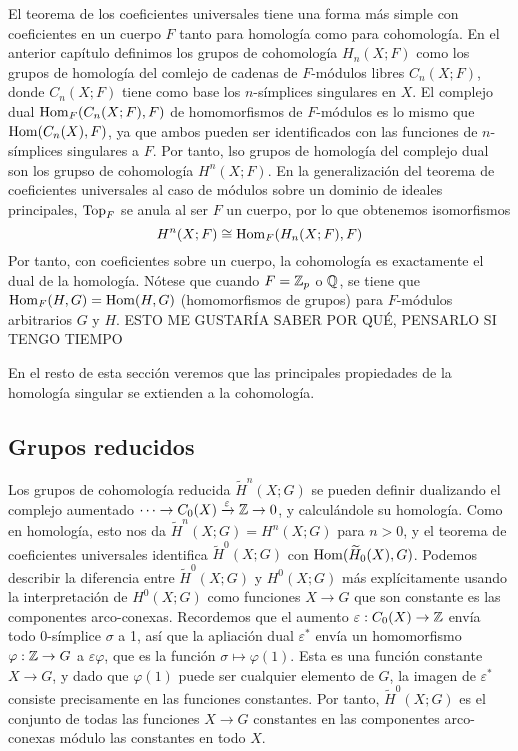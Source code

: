 \documentclass[TA.tex]{subfiles}
\begin{document}
El teorema de los coeficientes universales tiene una forma más simple con coeficientes en un cuerpo $F$ tanto para homología como para cohomología. En el anterior capítulo definimos los grupos de cohomología $H_n(X;F)$ como los grupos de homología del comlejo de cadenas de $F$-módulos libres $C_n(X;F)$, donde $C_n(X;F)$ tiene como base los $n$-símplices singulares en $X$. El complejo dual $\operatorname{Hom}_F(C_n(X;F),F)$ de homomorfismos de $F$-módulos es lo mismo que $\operatorname{Hom}(C_n(X),F)$, ya que ambos pueden ser identificados con las funciones de $n$-símplices singulares a $F$. Por tanto, lso grupos de homología del complejo dual son los grupso de cohomología $H^n(X;F)$. En la generalización del teorema de coeficientes universales al caso de módulos sobre un dominio de ideales principales, $\operatorname{Top}_F$ se anula al ser $F$ un cuerpo, por lo que obtenemos isomorfismos
\[
H^n(X;F)\cong \operatorname{Hom}_F(H_n(X;F),F)
\]
Por tanto, con coeficientes sobre un cuerpo, la cohomología es exactamente el dual de la homología. Nótese que cuando $F=\mathbb{Z}_p$ o $\mathbb{Q}$, se tiene que $\operatorname{Hom}_F(H,G)=\operatorname{Hom}(H,G)$ (homomorfismos de grupos) para $F$-módulos arbitrarios $G$ y $H$. ESTO ME GUSTARÍA SABER POR QUÉ, PENSARLO SI TENGO TIEMPO 

En el resto de esta sección veremos que las principales propiedades de la homología singular se extienden a la cohomología. 

\subsection{Grupos reducidos}
Los grupos de cohomología reducida $\widetilde{H}^n(X;G)$ se pueden definir dualizando el complejo aumentado $\cdots\to C_0(X)\xrightarrow{\varepsilon}\mathbb{Z}\to 0$, y calculándole su homología. Como en homología, esto nos da $\widetilde{H}^n(X;G)=H^n(X;G)$ para $n>0$, y el teorema de coeficientes universales identifica $\widetilde{H}^0(X;G)$ con $\operatorname{Hom}(\widetilde{H}_0(X),G)$. Podemos describir la diferencia entre $\widetilde{H}^0(X;G)$ y $H^0(X;G)$ más explícitamente usando la interpretación de $H^0(X;G)$ como funciones $X\to G$ que son constante es las componentes arco-conexas. Recordemos que el aumento $\varepsilon:C_0(X)\to\mathbb{Z}$ envía todo 0-símplice $\sigma$ a 1, así que la apliación dual $\varepsilon^*$ envía un homomorfismo $\varphi:\mathbb{Z}\to G$ a $\varepsilon\varphi$, que es la función $\sigma\mapsto\varphi(1)$. Esta es una función constante $X\to G$, y dado que $\varphi(1)$ puede ser cualquier elemento de $G$, la imagen de $\varepsilon^*$ consiste precisamente en las funciones constantes. Por tanto, $\widetilde{H}^0(X;G)$ es el conjunto de todas las funciones $X\to G$ constantes en las componentes arco-conexas módulo las constantes en todo $X$.
\end{document}
